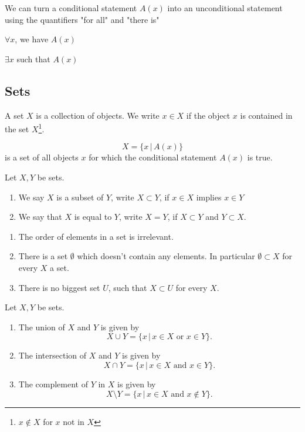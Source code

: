\documentclass[10pt, a4paper]{article}
\begin{document}
We can turn a conditional statement $A(x)$ into an unconditional statement using the quantifiers "for all" and "there is"

\begin{example}
    \phantom{}
    
    $\forall x$, we have $A(x)$
    
    $\exists x$ such that $A(x)$
\end{example}


\subsection{Sets}
A set $X$ is a collection of objects. We write $x \in X$ if the object $x$ is contained in the set $X$\footnote{$x \notin X$ for $x$ not in $X$}.

\[
X = \{x\,|\,A(x)\}
\]
is a set of all objects $x$ for which the conditional statement $A(x)$ is true.

\begin{definition}
    Let $X, Y$ be sets.
    \begin{enumerate}[label = (\alph*)]
        \item We say $X$ is a subset of $Y$, write $X \subset Y$, if $x \in X$ implies $x \in Y$
        \item We say that $X$ is equal to $Y$, write $X = Y$, if $X \subset Y$ and $Y \subset X$.
    \end{enumerate}
\end{definition}

\begin{remark}
    \begin{enumerate}[label = (\alph*)]
        \item The order of elements in a set is irrelevant.
        \item There is a set $\emptyset$ which doesn't contain any elements. In particular $\emptyset \subset X$ for every $X$ a set.
        \item There is no biggest set $U$, such that $X \subset U$ for every $X$.
    \end{enumerate}
\end{remark}

\begin{definition}
    Let $X, Y$ be sets.
    \begin{enumerate}[label = (\alph*)]
        \item The union of $X$ and $Y$ is given by
        \[
        X \cup Y = \{x\, |\, x \in X\text{ or } x \in Y\}.
        \]
        \item The intersection of $X$ and $Y$ is given by
        \[
        X \cap Y = \{x\, |\, x \in X\text{ and } x \in Y\}.
        \]
        \item The complement of $Y$ in $X$ is given by
        \[
        X \setminus Y = \{x\, |\, x \in X \text{ and } x \notin Y\}.
        \]
    \end{enumerate}
\end{definition}
\end{document}

